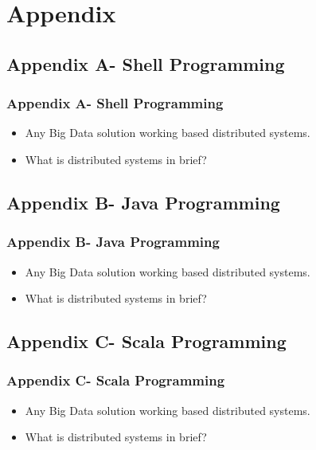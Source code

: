 \section{Appendix}
          
\subsection{Appendix A- Shell Programming}  
\begin{frame}
\frametitle{Appendix A- Shell Programming}
\begin{itemize}[<+->]
	\item Any Big Data solution working based distributed systems.
	\item What is distributed systems in brief?
\end{itemize}
\end{frame}

\subsection{Appendix B- Java Programming}   
\begin{frame}
\frametitle{Appendix B- Java Programming}
\begin{itemize}[<+->]
	\item Any Big Data solution working based distributed systems.
	\item What is distributed systems in brief?
\end{itemize}
\end{frame}


\subsection{Appendix C- Scala Programming}  
\begin{frame}
\frametitle{Appendix C- Scala Programming}
\begin{itemize}[<+->]
	\item Any Big Data solution working based distributed systems.
	\item What is distributed systems in brief?
\end{itemize}
\end{frame}

